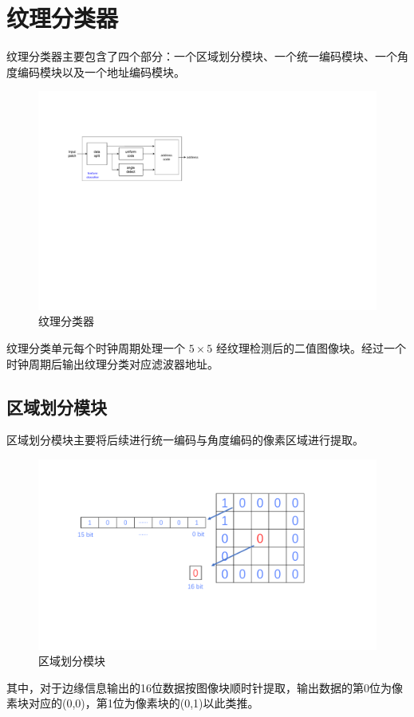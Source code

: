 \documentclass[12pt, a4paper, oneside]{ctexbook}
\begin{document}
	\section{纹理分类器}
	纹理分类器主要包含了四个部分：一个区域划分模块、一个统一编码模块、一个角度编码模块以及一个地址编码模块。
		\begin{figure}[h]	
		\centering
		\includegraphics[scale=1.0]{pic/texture_classifier.pdf}
		\caption{纹理分类器}
		\end{figure}
	纹理分类单元每个时钟周期处理一个 $5\times5$ 经纹理检测后的二值图像块。经过一个时钟周期后输出纹理分类对应滤波器地址。
	\subsection{区域划分模块}
	区域划分模块主要将后续进行统一编码与角度编码的像素区域进行提取。
		\begin{figure}[h]	
		\centering
		\includegraphics[scale=0.5]{pic/patch.pdf}
		\caption{区域划分模块}
		\end{figure}			
	\par 其中，对于边缘信息输出的16位数据按图像块顺时针提取，输出数据的第0位为像素块对应的(0,0)，第1位为像素块的(0,1)以此类推。
\end{document}
